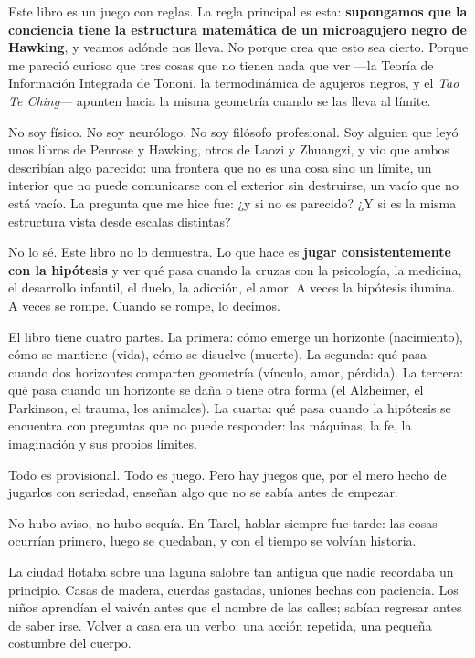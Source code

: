 Este libro es un juego con reglas. La regla principal es esta: \textbf{supongamos que la conciencia tiene la estructura matemática de un microagujero negro de Hawking}, y veamos adónde nos lleva. No porque crea que esto sea cierto. Porque me pareció curioso que tres cosas que no tienen nada que ver —la Teoría de Información Integrada de Tononi, la termodinámica de agujeros negros, y el \emph{Tao Te Ching}— apunten hacia la misma geometría cuando se las lleva al límite.

No soy físico. No soy neurólogo. No soy filósofo profesional. Soy alguien que leyó unos libros de Penrose y Hawking, otros de Laozi y Zhuangzi, y vio que ambos describían algo parecido: una frontera que no es una cosa sino un límite, un interior que no puede comunicarse con el exterior sin destruirse, un vacío que no está vacío. La pregunta que me hice fue: ¿y si no es parecido? ¿Y si es la misma estructura vista desde escalas distintas?

No lo sé. Este libro no lo demuestra. Lo que hace es \textbf{jugar consistentemente con la hipótesis} y ver qué pasa cuando la cruzas con la psicología, la medicina, el desarrollo infantil, el duelo, la adicción, el amor. A veces la hipótesis ilumina. A veces se rompe. Cuando se rompe, lo decimos.

El libro tiene cuatro partes. La primera: cómo emerge un horizonte (nacimiento), cómo se mantiene (vida), cómo se disuelve (muerte). La segunda: qué pasa cuando dos horizontes comparten geometría (vínculo, amor, pérdida). La tercera: qué pasa cuando un horizonte se daña o tiene otra forma (el Alzheimer, el Parkinson, el trauma, los animales). La cuarta: qué pasa cuando la hipótesis se encuentra con preguntas que no puede responder: las máquinas, la fe, la imaginación y sus propios límites.

Todo es provisional. Todo es juego. Pero hay juegos que, por el mero hecho de jugarlos con seriedad, enseñan algo que no se sabía antes de empezar.

\noindent {}

No hubo aviso, no hubo sequía. En Tarel, hablar siempre fue tarde: las cosas ocurrían primero, luego se quedaban, y con el tiempo se volvían historia.

La ciudad flotaba sobre una laguna salobre tan antigua que nadie recordaba un principio. Casas de madera, cuerdas gastadas, uniones hechas con paciencia. Los niños aprendían el vaivén antes que el nombre de las calles; sabían regresar antes de saber irse. Volver a casa era un verbo: una acción repetida, una pequeña costumbre del cuerpo.

